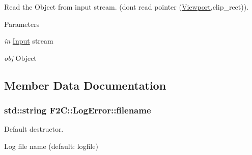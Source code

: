 Read the Object from input stream. (dont read pointer (\hyperlink{class_f2_c_1_1_viewport}{Viewport},clip\_\-rect)). 


\begin{DoxyParams}{Parameters}
\item[{\em in}]\hyperlink{class_f2_c_1_1_input}{Input} stream \item[{\em obj}]Object \end{DoxyParams}


\subsection{Member Data Documentation}
\hypertarget{class_f2_c_1_1_log_error_aa5dc474b29884812c02be68e1c45c56e}{
\subsubsection[{filename}]{\setlength{\rightskip}{0pt plus 5cm}std::string {\bf F2C::LogError::filename}}}
\label{class_f2_c_1_1_log_error_aa5dc474b29884812c02be68e1c45c56e}


Default destructor. 

Log file name (default: logfile) 